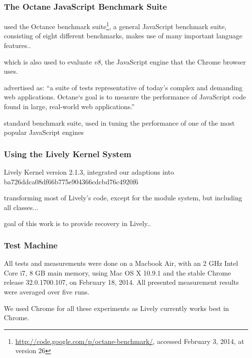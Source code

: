 
\subsubsection{The Octane JavaScript Benchmark Suite}

used the Octance benchmark suite\footnote{\url{http://code.google.com/p/octane-benchmark/}, accessed February 3, 2014, at version 26}, 
a general JavaScript benchmark suite, consisting of eight different benchmarks, makes use of many important language features..

which is also used to evaluate \emph{v8}, the JavaScript engine that the Chrome browser uses.

advertised as: ``a suite of tests representative of today’s complex and demanding web applications. Octane‘s goal is to measure the performance of JavaScript code found in large, real-world web applications.''

standard benchmark suite, used in tuning the performance of one of the most popular JavaScript engines


\subsubsection{Using the Lively Kernel System}

Lively Kernel version 2.1.3, integrated our adaptions into ba726ddca08df66b775e904366cdcbd76c4920f6

transforming most of Lively's code, except for the module system, but including all classes...

goal of this work is to provide recovery in Lively..

\subsubsection{Test Machine}

All tests and measurements were done on a Macbook Air, with an 2 GHz Intel Core i7, 8 GB main memory, using Mac OS X 10.9.1 and the stable Chrome release 32.0.1700.107, on February 18, 2014.
All presented measurement results were averaged over five runs.

We used Chrome for all these experiments as Lively currently works best in Chrome.







